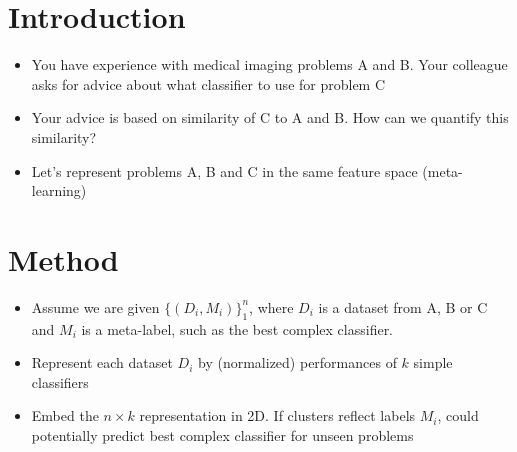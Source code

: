 \documentclass[a4paper,11pt]{article}
\begin{document}
\begin{slidetop}
\begin{multicols}{2}

\section*{Introduction}

\begin{itemize}

\item You have experience with medical imaging problems A and B. Your colleague asks for advice about what classifier to use for problem C

\item Your advice is based on similarity of C to A and B. How can we quantify this similarity?

\item Let's represent problems A, B and C in the same feature space (meta-learning)

\end{itemize}




\section*{Method}

\begin{itemize}

\item Assume we are given $\{(D_i, M_i)\}_{1}^{n}$, where $D_i$ is a dataset from A, B or C and $M_i$ is a meta-label, such as the best complex classifier.

\item Represent each dataset $D_i$ by (normalized) performances of $k$ simple classifiers

\item Embed the $n\times k$ representation in 2D. If clusters reflect labels $M_i$, could potentially predict best complex classifier for unseen problems

    \end{itemize}



\end{multicols}
\end{slidetop}
\end{document}

